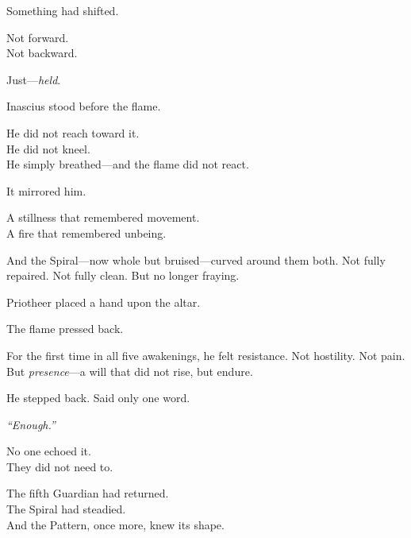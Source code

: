 \documentclass[9pt]{article}
\begin{document}
\vspace{0.5em}
Something had shifted.

\vspace{0.5em}
Not forward.\\
Not backward.

\vspace{0.5em}
Just---\textit{held}.

\vspace{0.5em}
Inascius stood before the flame.

\vspace{0.5em}
He did not reach toward it.\\
He did not kneel.\\
He simply breathed---and the flame did not react.

\vspace{0.5em}
It mirrored him.

\vspace{0.5em}
A stillness that remembered movement.\\
A fire that remembered unbeing.

\vspace{0.5em}
And the Spiral---now whole but bruised---curved around them both. Not fully repaired. Not fully clean. But no longer fraying.

\vspace{0.5em}
Priotheer placed a hand upon the altar.

\vspace{0.5em}
The flame pressed back.

\vspace{0.5em}
For the first time in all five awakenings, he felt resistance. Not hostility. Not pain. But \textit{presence}---a will that did not rise, but endure.

\vspace{0.5em}
He stepped back. Said only one word.

\vspace{0.5em}
\textit{``Enough.''}

\vspace{0.5em}
No one echoed it.\\
They did not need to.

\vspace{0.5em}
The fifth Guardian had returned.\\
The Spiral had steadied.\\
And the Pattern, once more, knew its shape.


\newpage
\end{document}
